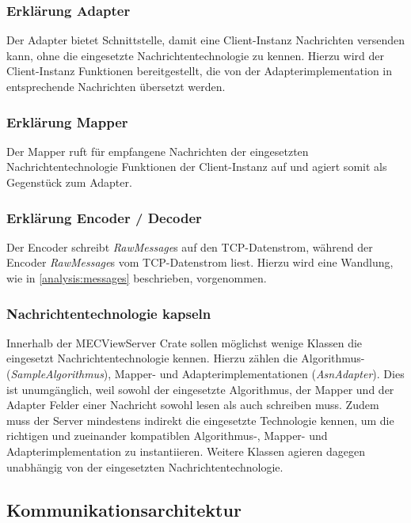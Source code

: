 \subsubsection{Erklärung Adapter}

Der Adapter bietet  Schnittstelle, damit eine Client-Instanz Nachrichten versenden kann, ohne die eingesetzte Nachrichtentechnologie zu kennen.
Hierzu wird der Client-Instanz Funktionen bereitgestellt, die von der Adapterimplementation in entsprechende Nachrichten übersetzt werden.

\subsubsection{Erklärung Mapper}

Der Mapper ruft für empfangene Nachrichten der eingesetzten Nachrichtentechnologie Funktionen der Client-Instanz auf und agiert somit als Gegenstück zum Adapter.

\subsubsection{Erklärung Encoder / Decoder}

Der Encoder schreibt \textit{RawMessage}s auf den TCP-Datenstrom, während der Encoder \textit{RawMessage}s vom TCP-Datenstrom liest.
Hierzu wird eine Wandlung, wie in \autoref{analysis:messages} beschrieben, vorgenommen.

\subsubsection{Nachrichtentechnologie kapseln}

Innerhalb der MECViewServer Crate sollen möglichst wenige Klassen die eingesetzt Nachrichtentechnologie kennen.
Hierzu zählen die Algorithmus- (\textit{SampleAlgorithmus}), Mapper- und Adapterimplementationen (\textit{AsnAdapter}).
Dies ist unumgänglich, weil sowohl der eingesetzte Algorithmus, der Mapper und der Adapter Felder einer Nachricht sowohl lesen als auch schreiben muss.
Zudem muss der Server mindestens indirekt die eingesetzte Technologie kennen, um die richtigen und zueinander kompatiblen Algorithmus-, Mapper- und Adapterimplementation zu instantiieren.
Weitere Klassen agieren dagegen unabhängig von der eingesetzten Nachrichtentechnologie.

\subsection{Kommunikationsarchitektur}
\label{design:communication:architecture}

